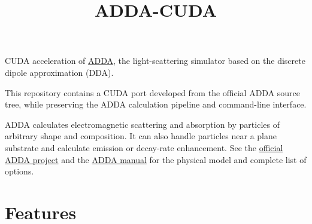 \documentclass[11pt,a4paper]{article}
\title{ADDA-CUDA}
\author{}
\date{}
\begin{document}
\sloppy

\maketitle

CUDA acceleration of \href{https://github.com/adda-team/adda}{ADDA}, the
light-scattering simulator based on the discrete dipole approximation (DDA).

This repository contains a CUDA port developed from the official ADDA source
tree, while preserving the ADDA calculation pipeline and command-line
interface.

ADDA calculates electromagnetic scattering and absorption by particles of
arbitrary shape and composition. It can also handle particles near a plane
substrate and calculate emission or decay-rate enhancement. See the
\href{https://github.com/adda-team/adda}{official ADDA project} and the
\href{https://github.com/adda-team/adda/blob/master/doc/manual.pdf}{ADDA manual} for the physical model and complete list of
options.

\section{Features}
\end{document}
